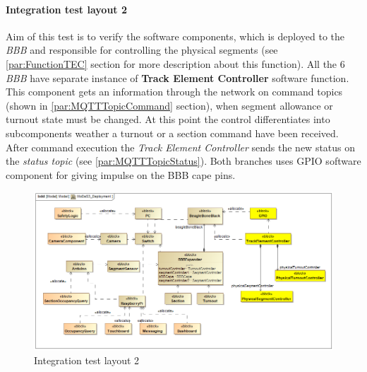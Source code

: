 \paragraph{Integration test layout 2}
Aim of this test is to verify the software components, which is deployed to the \textit{BBB} and responsible for controlling the physical segments (see \ref{par:FunctionTEC} section for more description about this function). All the 6 \textit{BBB} have separate instance of \textbf{Track Element Controller} software function. This component gets an information through the network on command topics (shown in \ref{par:MQTTTopicCommand} section), when segment allowance or turnout state must be changed. At this point the control differentiates into subcomponents weather a turnout or a section command have been received. After command execution the \textit{Track Element Controller} sends the new status on the \textit{status topic} (see \ref{par:MQTTTopicStatus}). Both branches uses GPIO software component for giving impulse on the BBB cape pins.
\begin{figure}[!h]
	\centering
	\includegraphics[width=150mm, keepaspectratio]{figures/testDesign/testLayoutSYSML/MoDeS3_Deployment-test2.png}
	\caption{Integration test layout 2}
	\label{fig:MoDeS3_Deployment-test2}
\end{figure}

